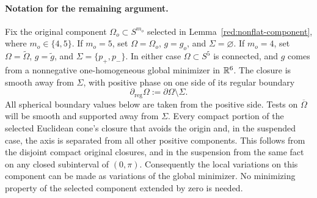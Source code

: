 \paragraph{Notation for the remaining argument.}\label{red:working-domain}
Fix the original component $\Omega_o\subset S^{m_o}$ selected in
Lemma~\ref{red:nonflat-component}, where $m_o\in\{4,5\}$.  If $m_o=5$,
set $\Omega=\Omega_o$, $g=g_o$, and $\Sigma=\varnothing$.  If $m_o=4$,
set $\Omega=\widetilde\Omega$, $g=\widetilde g$, and
$\Sigma=\{p_+,p_-\}$.  In either case $\Omega\subset S^5$ is connected,
and $g$ comes from a nonnegative one-homogeneous global minimizer in
$\mathbb R^6$.  The closure is smooth away from $\Sigma$, with positive phase
on one side of its regular boundary
\[
 \partial_{\mathrm{reg}}\Omega:=\partial\Omega\setminus\Sigma.
\]
All spherical boundary values below are taken from the positive side.
Tests on $\overline\Omega$ will be smooth and supported away from $\Sigma$.
Every compact portion of the selected Euclidean cone's closure that avoids
the origin and, in the suspended case, the axis is separated from all other
positive components.  This follows from the disjoint compact original
closures, and in the suspension from the same fact on any closed subinterval
of $(0,\pi)$.  Consequently the local variations on this component can be
made as variations of the global minimizer.  No minimizing property of the
selected component extended by zero is needed.
